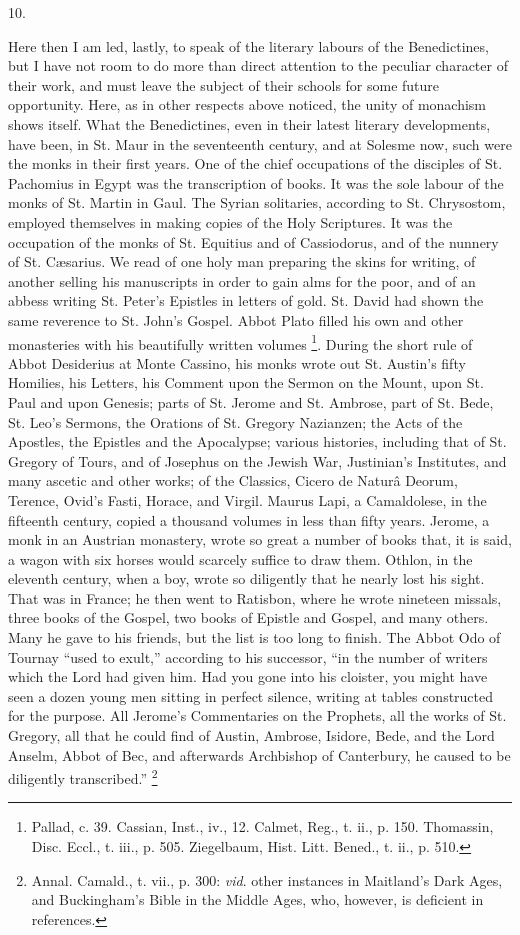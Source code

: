 10.

Here then I am led, lastly, to speak of the literary labours of the
Benedictines, but I have not room to do more than direct attention to
the peculiar character of their work, and must leave the subject of
their schools for some future opportunity. Here, as in other respects
above noticed, the unity of monachism shows itself. What the
Benedictines, even in their latest literary developments, have been,
in St. Maur in the seventeenth century, and at Solesme now, such were
the monks in their first years. One of the chief occupations of the
disciples of St. Pachomius in Egypt was the transcription of books. It
was the sole labour of the monks of St. Martin in Gaul. The Syrian
solitaries, according to St. Chrysostom, employed themselves in making
copies of the Holy Scriptures. It was the occupation of the monks of
St. Equitius and of Cassiodorus, and of the nunnery of St. Cæsarius.
We read of one holy man preparing the skins for writing, of another
selling his manuscripts in order to gain alms for the poor, and of an
abbess writing St. Peter's Epistles in letters of gold. St. David had
shown the same reverence to St. John's Gospel. Abbot Plato filled his
own and other monasteries with his beautifully written volumes \footnote{Pallad, c.
39. Cassian, Inst., iv., 12. Calmet, Reg., t. ii., p. 150. Thomassin,
Disc. Eccl., t. iii., p. 505. Ziegelbaum, Hist. Litt. Bened., t. ii.,
p. 510.}. During the short rule of Abbot Desiderius at Monte Cassino,
his monks wrote out St. Austin's fifty Homilies, his Letters, his
Comment upon the Sermon on the Mount, upon St. Paul and upon Genesis;
parts of St. Jerome and St. Ambrose, part of St. Bede, St. Leo's
Sermons, the Orations of St. Gregory Nazianzen; the Acts of the
Apostles, the Epistles and the Apocalypse; various histories,
including that of St. Gregory of Tours, and of Josephus on the Jewish
War, Justinian's Institutes, and many ascetic and other works; of the
Classics, Cicero de Naturâ Deorum, Terence, Ovid's Fasti, Horace, and
Virgil. Maurus Lapi, a Camaldolese, in the fifteenth century, copied a
thousand volumes in less than fifty years. Jerome, a monk in an
Austrian monastery, wrote so great a number of books that, it is said,
a wagon with six horses would scarcely suffice to draw them. Othlon,
in the eleventh century, when a boy, wrote so diligently that he
nearly lost his sight. That was in France; he then went to Ratisbon,
where he wrote nineteen missals, three books of the Gospel, two books
of Epistle and Gospel, and many others. Many he gave to his friends,
but the list is too long to finish. The Abbot Odo of Tournay
``used to exult,'' according to his successor, ``in the
number of writers which the Lord had given him. Had you gone into his
cloister, you might have seen a dozen young men sitting in perfect
silence, writing at tables constructed for the purpose. All Jerome's
Commentaries on the Prophets, all the works of St. Gregory, all that
he could find of Austin, Ambrose, Isidore, Bede, and the Lord Anselm,
Abbot of Bec, and afterwards Archbishop of Canterbury, he caused
to be diligently transcribed.'' \footnote{Annal. Camald.,
t. vii., p. 300: \emph{vid}. other instances in Maitland's Dark Ages,
and Buckingham's Bible in the Middle Ages, who, however, is deficient
in references.}

